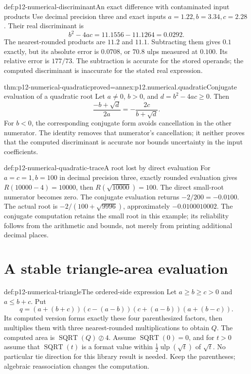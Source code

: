 \begin{hbexample}{def:p12-numerical-discriminant}{An exact difference with contaminated input products}
Use decimal precision three and exact inputs
\(a=1.22,b=3.34,c=2.28\). Their real discriminant is
\[
 b^2-4ac=11.1556-11.1264=0.0292.
\]
The nearest-rounded products are \(11.2\) and \(11.1\).
Subtracting them gives \(0.1\) exactly, but its absolute error is
\(0.0708\), or \(70.8\) ulps measured at \(0.100\).
Its relative error is \(177/73\). The subtraction is accurate for
the stored operands; the computed discriminant is inaccurate for the
stated real expression.
\end{hbexample}

\begin{hbtheorem}{thm:p12-numerical-quadratic}{proved=annex:p12.numerical.quadratic}{Conjugate evaluation of a quadratic root}
Let \(a\ne0\), \(b>0\), and \(d=b^2-4ac\geq0\). Then
\[
 \frac{-b+\sqrt d}{2a}=-\frac{2c}{b+\sqrt d}.
\]
For \(b<0\), the corresponding conjugate form avoids cancellation in
the other numerator. The identity removes that numerator's cancellation;
it neither proves that the computed discriminant is accurate nor bounds
uncertainty in the input coefficients.
\end{hbtheorem}

\begin{hbexample}{def:p12-numerical-quadratic-trace}{A root lost by direct evaluation}
For \(a=c=1,b=100\) in decimal precision three, exactly rounded
evaluation gives \(R(10000-4)=10000\), then \(R(\sqrt{10000})=100\).
The direct small-root numerator becomes zero. The conjugate evaluation
returns \(-2/200=-0.0100\). The actual root is
\(-2/(100+\sqrt{9996})\), approximately \(-0.0100010002\).
The conjugate computation retains the small root in this example;
its reliability follows from the arithmetic and bounds, not merely from
printing additional decimal places.
\end{hbexample}

\section{A stable triangle-area evaluation}

\begin{hbdefinition}{def:p12-numerical-triangle}{The ordered-side expression}
Let \(a\geq b\geq c>0\) and \(a\leq b+c\). Put
\[
 q=(a+(b+c))(c-(a-b))(c+(a-b))(a+(b-c)).
\]
Its computed version forms exactly these four parenthesized factors,
then multiplies them with three nearest-rounded multiplications to
obtain \(Q\). The computed area is
\(\operatorname{SQRT}(Q)\oslash4\). Assume
\(\operatorname{SQRT}(0)=0\), and for \(t>0\) assume that
\(\operatorname{SQRT}(t)\) is a format value within
\(\tfrac12\operatorname{ulp}(\sqrt t)\) of \(\sqrt t\).
No particular tie direction for this library result is needed.
Keep the parentheses; algebraic reassociation changes the computation.
\end{hbdefinition}

